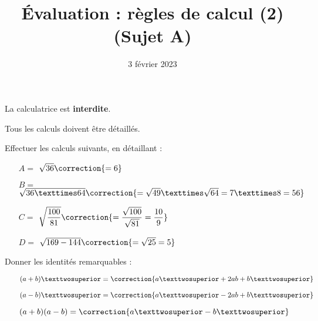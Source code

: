 \documentclass[
	classe=$2^{de}$,
]{évaluation}
\date{3 février 2023}
\begin{document}
\title{Évaluation : règles de calcul (2) (Sujet A)}
\maketitle

\begin{tcolorbox}
	La calculatrice est \textbf{interdite}.

	Tous les calculs doivent être détaillés.
\end{tcolorbox}

\begin{exercice}[2]
	Effectuer les calculs suivants, en détaillant :
	\begin{enumerate}
		\item[$A =$] $\sqrt{36} \correction{ = 6}$
		\item[$B =$] $\sqrt{36 × 64} \correction{ = \sqrt{49} × \sqrt{64} = 7 × 8 = 56}$
		\item[$C =$] $\sqrt{\dfrac{100}{81}} \correction{ = \dfrac{\sqrt{100}}{\sqrt{81}} = \dfrac{10}{9}}$
		\item[$D =$] $\sqrt{169 - 144} \correction{ = \sqrt{25} = 5}$
	\end{enumerate}
\end{exercice}

\begin{exercice}[1,5]
	Donner les identités remarquables :
	\begin{enumerate}
		\item[\circled{1}] $(a + b)² = \correction{a² + 2ab + b²}$
		\item[\circled{2}] $(a - b)² = \correction{a² - 2ab + b²}$
		\item[\circled{3}] $(a + b)(a - b) = \correction{a² - b²}$
	\end{enumerate}
\end{exercice}
\end{document}
